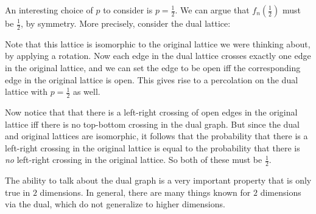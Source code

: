 \documentclass[a4paper]{article}
\begin{document}
An interesting choice of $p$ to consider is $p = \frac{1}{2}$. We can argue that $f_n(\frac{1}{2})$ must be $\frac{1}{2}$, by symmetry. More precisely, consider the dual lattice:
\begin{center}
\end{center}
Note that this lattice is isomorphic to the original lattice we were thinking about, by applying a rotation. Now each edge in the dual lattice crosses exactly one edge in the original lattice, and we can set the edge to be open iff the corresponding edge in the original lattice is open. This gives rise to a percolation on the dual lattice with $p = \frac{1}{2}$ as well.

Now notice that that there is a left-right crossing of open edges in the original lattice iff there is no top-bottom crossing in the dual graph. But since the dual and original lattices are isomorphic, it follows that the probability that there is a left-right crossing in the original lattice is equal to the probability that there is \emph{no} left-right crossing in the original lattice. So both of these must be $\frac{1}{2}$.

The ability to talk about the dual graph is a very important property that is only true in $2$ dimensions. In general, there are many things known for $2$ dimensions via the dual, which do not generalize to higher dimensions.
\end{document}
